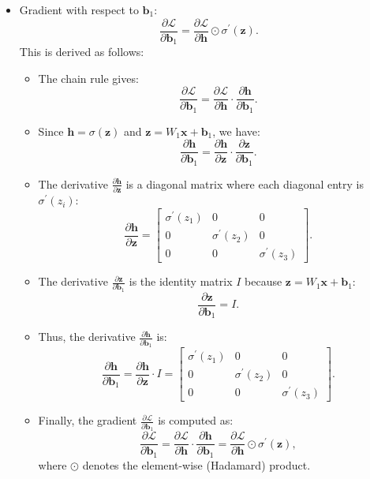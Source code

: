 \begin{notechapter}
\begin{itemize}
    \item Gradient with respect to \( \mathbf{b}_1 \):
    \[
    \frac{\partial \mathcal{L}}{\partial \mathbf{b}_1} = 
    \frac{\partial \mathcal{L}}{\partial \mathbf{h}} \odot \sigma^{\prime}(\mathbf{z}).
    \]
    This is derived as follows:
    \begin{itemize}
        \item The chain rule gives:
        \[
        \frac{\partial \mathcal{L}}{\partial \mathbf{b}_1} = 
        \frac{\partial \mathcal{L}}{\partial \mathbf{h}} 
        \cdot \frac{\partial \mathbf{h}}{\partial \mathbf{b}_1}.
        \]
        \item Since \( \mathbf{h} = \sigma(\mathbf{z}) \) and 
        \( \mathbf{z} = W_1 \mathbf{x} + \mathbf{b}_1 \), we have:
        \[
        \frac{\partial \mathbf{h}}{\partial \mathbf{b}_1} = 
        \frac{\partial \mathbf{h}}{\partial \mathbf{z}} \cdot 
        \frac{\partial \mathbf{z}}{\partial \mathbf{b}_1}.
        \]
        \item The derivative \( \frac{\partial \mathbf{h}}{\partial \mathbf{z}} \) 
        is a diagonal matrix where each diagonal entry is \( \sigma^{\prime}(z_i) \):
        \[
        \frac{\partial \mathbf{h}}{\partial \mathbf{z}} = 
        \begin{bmatrix}
        \sigma^{\prime}(z_1) & 0 & 0 \\
        0 & \sigma^{\prime}(z_2) & 0 \\
        0 & 0 & \sigma^{\prime}(z_3)
        \end{bmatrix}.
        \]
        \item The derivative \( \frac{\partial \mathbf{z}}{\partial \mathbf{b}_1} \) 
        is the identity matrix \( I \) because \( \mathbf{z} = W_1 \mathbf{x} + \mathbf{b}_1 \):
        \[
        \frac{\partial \mathbf{z}}{\partial \mathbf{b}_1} = I.
        \]
        \item Thus, the derivative \( \frac{\partial \mathbf{h}}{\partial \mathbf{b}_1} \) 
        is:
        \[
        \frac{\partial \mathbf{h}}{\partial \mathbf{b}_1} = 
        \frac{\partial \mathbf{h}}{\partial \mathbf{z}} \cdot I = 
        \begin{bmatrix}
        \sigma^{\prime}(z_1) & 0 & 0 \\
        0 & \sigma^{\prime}(z_2) & 0 \\
        0 & 0 & \sigma^{\prime}(z_3)
        \end{bmatrix}.
        \]
        \item Finally, the gradient \( \frac{\partial \mathcal{L}}{\partial \mathbf{b}_1} \) 
        is computed as:
        \[
        \frac{\partial \mathcal{L}}{\partial \mathbf{b}_1} = 
        \frac{\partial \mathcal{L}}{\partial \mathbf{h}} \cdot 
        \frac{\partial \mathbf{h}}{\partial \mathbf{b}_1} = 
        \frac{\partial \mathcal{L}}{\partial \mathbf{h}} \odot \sigma^{\prime}(\mathbf{z}),
        \]
        where \( \odot \) denotes the element-wise (Hadamard) product.
    \end{itemize}
\end{itemize}
\end{notechapter}
